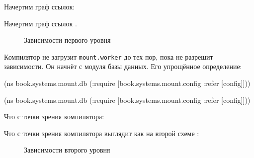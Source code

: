 \ifx\MODE\PRINT

\noindent
Начертим граф ссылок:

\begin{figure}[h!]
\end{figure}

\fi

\ifx\MODE\EBOOK

\noindent
Начертим граф ссылок .

\begin{figure}[ht!]
  \caption{Зависимости первого уровня}
  \label{fig:chart-sys-2}
\end{figure}

\fi

Компилятор не загрузит \verb|mount.worker| до тех пор, пока не разрешит
зависимости. Он начнёт с модуля базы данных. Его упрощённое определение:

\ifx\DEVICETYPE\MOBILE

\begin{english}
  \begin{clojure}
(ns book.systems.mount.db
  (:require
   [book.systems.mount.config
    :refer [config]]))
  \end{clojure}
\end{english}

\else

\begin{english}
  \begin{clojure}
(ns book.systems.mount.db
  (:require
   [book.systems.mount.config :refer [config]]))
  \end{clojure}
\end{english}

\fi

\ifx\MODE\PRINT

\noindent
Что с точки зрения компилятора:

\begin{figure}[h!]
\end{figure}

\fi

\ifx\MODE\EBOOK

\noindent
Что с точки зрения компилятора выглядит как на второй схеме
:

\begin{figure}[b!]
  \caption{Зависимости второго уровня}
  \label{fig:chart-sys-3}
\end{figure}

